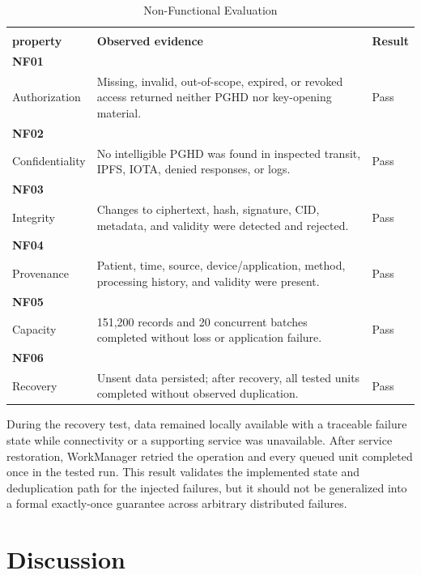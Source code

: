 \begin{table}[t]
	\caption{Non-Functional Evaluation}
	\label{tab:nf-results}
	\centering
	\scriptsize
	\begin{tabular}{@{}p{}p{}p{}@{}}
		\toprule
		\shortstack[l]{\textbf{Test/}\\\textbf{property}} & \textbf{Observed evidence} & \textbf{Result} \\
		\midrule
		\textbf{NF01}\\Authorization & Missing, invalid, out-of-scope, expired, or revoked access returned neither PGHD nor key-opening material. & Pass \\
		\textbf{NF02}\\Confidentiality & No intelligible PGHD was found in inspected transit, IPFS, IOTA, denied responses, or logs. & Pass \\
		\textbf{NF03}\\Integrity & Changes to ciphertext, hash, signature, CID, metadata, and validity were detected and rejected. & Pass \\
		\textbf{NF04}\\Provenance & Patient, time, source, device/application, method, processing history, and validity were present. & Pass \\
		\textbf{NF05}\\Capacity & 151,200 records and 20 concurrent batches completed without loss or application failure. & Pass \\
		\textbf{NF06}\\Recovery & Unsent data persisted; after recovery, all tested units completed without observed duplication. & Pass \\
		\bottomrule
	\end{tabular}
\end{table}

During the recovery test, data remained locally available with a traceable failure state while connectivity or a supporting service was unavailable.
After service restoration, WorkManager retried the operation and every queued unit completed once in the tested run.
This result validates the implemented state and deduplication path for the injected failures, but it should not be generalized into a formal exactly-once guarantee across arbitrary distributed failures.

\FloatBarrier

\section{Discussion}


